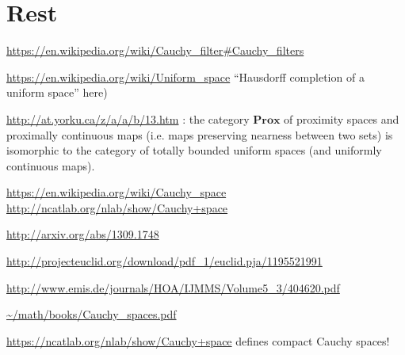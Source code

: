 \section{Rest}

\url{https://en.wikipedia.org/wiki/Cauchy\_filter\#Cauchy\_filters}

\url{https://en.wikipedia.org/wiki/Uniform\_space} ``Hausdorff completion of a
uniform space'' here)

\url{http://at.yorku.ca/z/a/a/b/13.htm} : the category $\mathbf{Prox}$ of proximity
spaces and proximally continuous maps (i.e. maps preserving nearness between
two sets) is isomorphic to the category of totally bounded uniform spaces (and
uniformly continuous maps).

\url{https://en.wikipedia.org/wiki/Cauchy\_space}
\url{http://ncatlab.org/nlab/show/Cauchy+space}

\url{http://arxiv.org/abs/1309.1748}

\url{http://projecteuclid.org/download/pdf\_1/euclid.pja/1195521991}

\url{http://www.emis.de/journals/HOA/IJMMS/Volume5\_3/404620.pdf}

\url{\~/math/books/Cauchy\_spaces.pdf}

\url{https://ncatlab.org/nlab/show/Cauchy+space} defines compact Cauchy spaces!